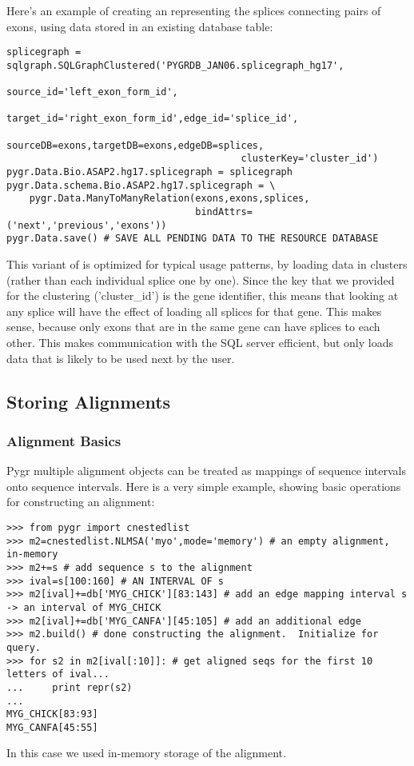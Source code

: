 \documentclass{howto}
\begin{document}
Here's an example of creating an  representing
the splices connecting pairs of exons, using data stored in an
existing database table:
\begin{verbatim}
splicegraph = sqlgraph.SQLGraphClustered('PYGRDB_JAN06.splicegraph_hg17',
                                         source_id='left_exon_form_id',
                                         target_id='right_exon_form_id',edge_id='splice_id',
                                         sourceDB=exons,targetDB=exons,edgeDB=splices,
                                         clusterKey='cluster_id')
pygr.Data.Bio.ASAP2.hg17.splicegraph = splicegraph
pygr.Data.schema.Bio.ASAP2.hg17.splicegraph = \
    pygr.Data.ManyToManyRelation(exons,exons,splices,
                                 bindAttrs=('next','previous','exons'))
pygr.Data.save() # SAVE ALL PENDING DATA TO THE RESOURCE DATABASE
\end{verbatim}
This variant of  is optimized for typical usage patterns,
by loading data in clusters (rather than each individual splice one by one).
Since the key that we provided for the clustering ('cluster_id') is the 
gene identifier, this means that looking at any splice will have the effect
of loading all splices for that gene.  This makes sense, because only exons
that are in the same gene can have splices to each other.  This makes
communication with the SQL server efficient, but only loads data that
is likely to be used next by the user.

\subsection{Storing Alignments}
\subsubsection{Alignment Basics}

Pygr multiple alignment objects can be treated as mappings of sequence intervals onto sequence intervals.  Here is a very simple example, showing basic operations for constructing an alignment:

\begin{verbatim}
>>> from pygr import cnestedlist
>>> m2=cnestedlist.NLMSA('myo',mode='memory') # an empty alignment, in-memory
>>> m2+=s # add sequence s to the alignment
>>> ival=s[100:160] # AN INTERVAL OF s
>>> m2[ival]+=db['MYG_CHICK'][83:143] # add an edge mapping interval s -> an interval of MYG_CHICK
>>> m2[ival]+=db['MYG_CANFA'][45:105] # add an additional edge
>>> m2.build() # done constructing the alignment.  Initialize for query.
>>> for s2 in m2[ival[:10]]: # get aligned seqs for the first 10 letters of ival...
...     print repr(s2)
...
MYG_CHICK[83:93]
MYG_CANFA[45:55]
\end{verbatim}
In this case we used in-memory storage of the alignment.  
\end{document}
